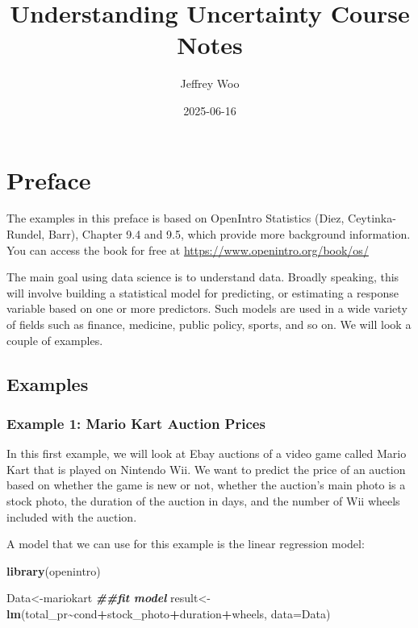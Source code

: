\documentclass[
]{book}
\title{Understanding Uncertainty Course Notes}
\author{Jeffrey Woo}
\date{2025-06-16}
\newenvironment{Shaded}{\begin{snugshade}}{\end{snugshade}}
\newcommand{\AttributeTok}[1]{\textcolor[rgb]{0.13,0.29,0.53}{#1}}
\newcommand{\DocumentationTok}[1]{\textcolor[rgb]{0.56,0.35,0.01}{\textbf{\textit{#1}}}}
\newcommand{\FunctionTok}[1]{\textcolor[rgb]{0.13,0.29,0.53}{\textbf{#1}}}
\newcommand{\NormalTok}[1]{#1}
\newcommand{\OtherTok}[1]{\textcolor[rgb]{0.56,0.35,0.01}{#1}}
\newcommand{\SpecialCharTok}[1]{\textcolor[rgb]{0.81,0.36,0.00}{\textbf{#1}}}
\begin{document}
\maketitle

{
\setcounter{tocdepth}{1}
\tableofcontents
}
\chapter*{Preface}\label{preface}

The examples in this preface is based on OpenIntro Statistics (Diez, Ceytinka-Rundel, Barr), Chapter 9.4 and 9.5, which provide more background information. You can access the book for free at \url{https://www.openintro.org/book/os/}

The main goal using data science is to understand data. Broadly speaking, this will involve building a statistical model for predicting, or estimating a response variable based on one or more predictors. Such models are used in a wide variety of fields such as finance, medicine, public policy, sports, and so on. We will look a couple of examples.

\section{Examples}\label{examples}

\subsection{Example 1: Mario Kart Auction Prices}\label{example-1-mario-kart-auction-prices}

In this first example, we will look at Ebay auctions of a video game called Mario Kart that is played on Nintendo Wii. We want to predict the price of an auction based on whether the game is new or not, whether the auction's main photo is a stock photo, the duration of the auction in days, and the number of Wii wheels included with the auction.

A model that we can use for this example is the linear regression model:

\begin{Shaded}
\begin{Highlighting}[]
\FunctionTok{library}\NormalTok{(openintro)}

\NormalTok{Data}\OtherTok{\textless{}{-}}\NormalTok{mariokart}
\DocumentationTok{\#\#fit model}
\NormalTok{result}\OtherTok{\textless{}{-}}\FunctionTok{lm}\NormalTok{(total\_pr}\SpecialCharTok{\textasciitilde{}}\NormalTok{cond}\SpecialCharTok{+}\NormalTok{stock\_photo}\SpecialCharTok{+}\NormalTok{duration}\SpecialCharTok{+}\NormalTok{wheels, }\AttributeTok{data=}\NormalTok{Data)}
\end{Highlighting}
\end{Shaded}
\end{document}
